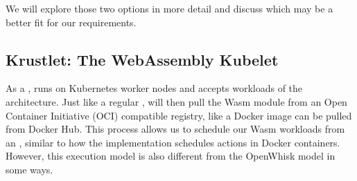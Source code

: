We will explore those two options in more detail and discuss which may be a better fit for our requirements.

\subsection{Krustlet: The WebAssembly Kubelet}

As a ,  runs on Kubernetes worker nodes and accepts workloads of the  architecture. Just like a regular ,  will then pull the Wasm module from an Open Container Initiative (OCI) compatible registry, like a Docker image can be pulled from Docker Hub. This process allows us to schedule our Wasm workloads from an , similar to how the  implementation schedules actions in Docker containers. However, this execution model is also different from the OpenWhisk model in some ways.

